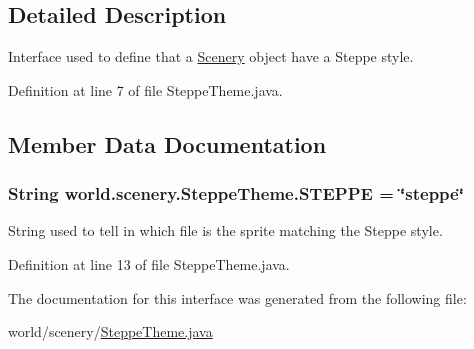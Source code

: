 \subsection{Detailed Description}
Interface used to define that a \hyperlink{a00024}{Scenery} object have a Steppe style. 

Definition at line 7 of file Steppe\-Theme.\-java.



\subsection{Member Data Documentation}
\hypertarget{a00027_a03bdfdc54a3a5d52694b77342ec34e3e}{
\subsubsection[{S\-T\-E\-P\-P\-E}]{\setlength{\rightskip}{0pt plus 5cm}String world.\-scenery.\-Steppe\-Theme.\-S\-T\-E\-P\-P\-E = \char`\"{}steppe\char`\"{}\hspace{0.3cm}{\ttfamily [static]}}}\label{a00027_a03bdfdc54a3a5d52694b77342ec34e3e}


String used to tell in which file is the sprite matching the Steppe style. 



Definition at line 13 of file Steppe\-Theme.\-java.



The documentation for this interface was generated from the following file\-:\begin{DoxyCompactItemize}
\item 
world/scenery/\hyperlink{a00073}{Steppe\-Theme.\-java}\end{DoxyCompactItemize}
